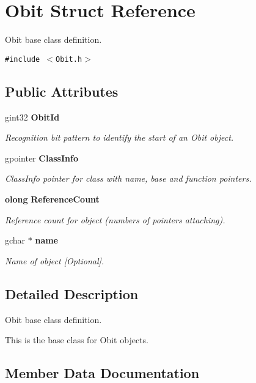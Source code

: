 \section{Obit Struct Reference}
\label{structObit}
Obit base class definition.  


{\tt \#include $<$Obit.h$>$}

\subsection*{Public Attributes}
\begin{CompactItemize}
\item 
gint32 {\bf Obit\-Id}
\begin{CompactList}\small\item\em Recognition bit pattern to identify the start of an Obit object. \item\end{CompactList}\item 
gpointer {\bf Class\-Info}
\begin{CompactList}\small\item\em Class\-Info pointer for class with name, base and function pointers. \item\end{CompactList}\item 
{\bf olong} {\bf Reference\-Count}
\begin{CompactList}\small\item\em Reference count for object (numbers of pointers attaching). \item\end{CompactList}\item 
gchar $\ast$ {\bf name}
\begin{CompactList}\small\item\em Name of object [Optional]. \item\end{CompactList}\end{CompactItemize}


\subsection{Detailed Description}
Obit base class definition. 

This is the base class for Obit objects. 



\subsection{Member Data Documentation}
